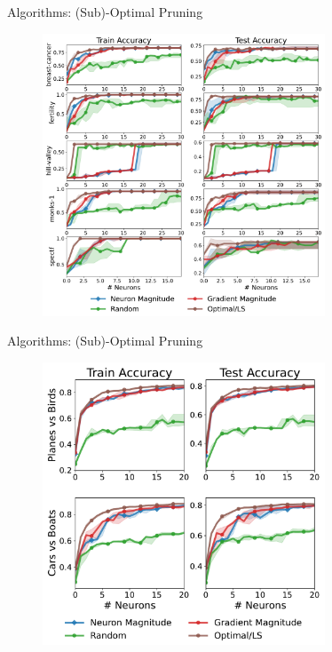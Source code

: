 \documentclass[usenames,dvipsnames,mathserif,notheorems]{beamer}
\begin{document}
\begin{frame}{Algorithms: (Sub)-Optimal Pruning}
	\begin{figure}[t]
		\centering
		\includegraphics[width=0.75\textwidth]{assets/uci_pruning_full_paper.pdf}
	\end{figure}
\end{frame}

\begin{frame}{Algorithms: (Sub)-Optimal Pruning}
	\begin{figure}[t]
		\centering
		\includegraphics[width=0.75\textwidth]{assets/prune_cifar.pdf}
	\end{figure}
\end{frame}
\end{document}
